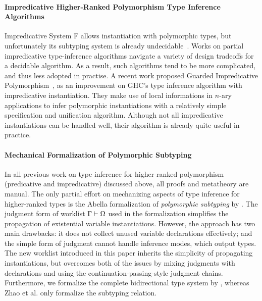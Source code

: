 \paragraph{Impredicative Higher-Ranked Polymorphism Type Inference Algorithms}
Impredicative System F allows instantiation with polymorphic types,
but unfortunately its subtyping system is already undecidable~\cite{tiuryn1996subtyping}.
Works on partial impredicative type-inference algorithms\cite{le2003ml,leijen2008hmf,vytiniotis2008fph}
navigate a variety of design tradeoffs for a decidable algorithm.
As a result, such algorithms tend to be more complicated, and thus less adopted in practise.
A recent work proposed Guarded Impredicative Polymorphism~\cite{},
as an improvement on GHC's type inference algorithm with impredicative instantiation.
They make use of local informations in $n$-ary applications to
infer polymorphic instantiations with a relatively simple specification and unification algorithm.
Although not all impredicative instantiations can be handled well,
their algorithm is already quite useful in practice.

\paragraph{Mechanical Formalization of Polymorphic Subtyping}
In all previous work on type inference for higher-ranked polymorphism
(predicative and impredicative) discussed above, all proofs and
metatheory are manual. The only partial effort on mechanizing aspects of type inference
for higher-ranked types is
the Abella formalization of \emph{polymorphic subtyping} by \citet{itp2018}.
The judgment form of worklist $\Gamma \vdash \Omega$ used in the formalization simplifies
the propagation of existential variable instantiations.
However, the approach has two main drawbacks:
it does not collect unused variable declarations effectively;
and the simple form of judgment cannot handle inference modes, which output types.
The new worklist introduced in this paper inherits the simplicity of propagating instantiations,
but overcomes both of the issues by mixing judgments with declarations
and using the continuation-passing-style judgment chains. Furthermore,
we formalize the complete bidirectional type system by
\citet{dunfield2013complete}, whereas Zhao et al. only formalize
the subtyping relation. 

